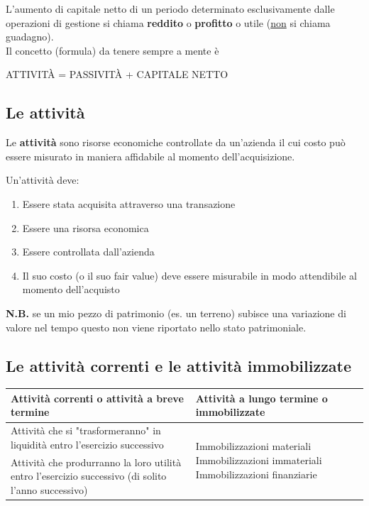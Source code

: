 \documentclass{article}
\renewcommand{\arraystretch}{1.5}
\begin{document}
L'aumento di capitale netto di un periodo determinato esclusivamente dalle
operazioni di gestione si chiama \textbf{reddito} o \textbf{profitto} o utile (\underline{non} si chiama
guadagno).
\vspace*{0.2cm}\\
Il concetto (formula) da tenere sempre a mente è 
\begin{center}
    ATTIVITÀ = PASSIVITÀ + CAPITALE NETTO
\end{center}



\subsection{Le attività}
\begin{center}
    Le \textbf{attività} sono risorse economiche controllate da un'azienda il cui costo può essere misurato in maniera affidabile al momento dell'acquisizione.
\end{center}
Un'attività deve:
\begin{enumerate}
    \item Essere stata acquisita attraverso una transazione
    \item Essere una risorsa economica
    \item Essere controllata dall'azienda
    \item Il suo costo (o il suo fair value) deve essere misurabile in modo attendibile al momento dell'acquisto
\end{enumerate}
\textbf{N.B.} se un mio pezzo di patrimonio (es. un terreno) subisce una variazione di valore nel tempo questo non viene riportato nello stato patrimoniale.


\subsection{Le attività correnti e le attività
immobilizzate}
\begin{center}
    \renewcommand{\arraystretch}{2}
    \begin{tabular}{|m{5cm}|m{5cm}|}
        \hline 
        \textbf{Attività correnti o attività a breve termine} & \textbf{Attività a lungo termine o immobilizzate}\\
        \hline 
        Attività che si "trasformeranno" in liquidità entro l'esercizio successivo & \multirow{2}{14em}{Immobilizzazioni materiali Immobilizzazioni immateriali  Immobilizzazioni finanziarie}
        \\
        Attività che produrranno la loro utilità entro l'esercizio successivo (di solito l'anno successivo) & \\
        \hline 
    \end{tabular}
\end{center}
\end{document}
